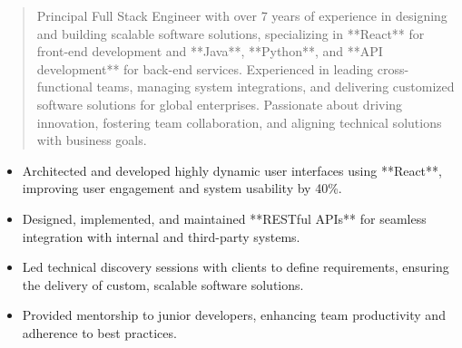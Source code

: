 



\makecvheader

\begin{quote}
  \noindent
  Principal Full Stack Engineer with over 7 years of experience in designing and building scalable software solutions, specializing in **React** for front-end development and **Java**, **Python**, and **API development** for back-end services. Experienced in leading cross-functional teams, managing system integrations, and delivering customized software solutions for global enterprises. Passionate about driving innovation, fostering team collaboration, and aligning technical solutions with business goals.
\end{quote}

\par\smallskip
\noindent
\begin{minipage}{20cm}
  \begin{minipage}{9.75cm}
    \begin{itemize}
      \item Architected and developed highly dynamic user interfaces using **React**, improving user engagement and system usability by 40\%.
      \item Designed, implemented, and maintained **RESTful APIs** for seamless integration with internal and third-party systems.
    \end{itemize}
  \end{minipage}
  \hfill
  \begin{minipage}{9.75cm}
    \begin{itemize}
      \item Led technical discovery sessions with clients to define requirements, ensuring the delivery of custom, scalable software solutions.
      \item Provided mentorship to junior developers, enhancing team productivity and adherence to best practices.
    \end{itemize}
  \end{minipage}
\end{minipage}
\par\smallskip
\divider

